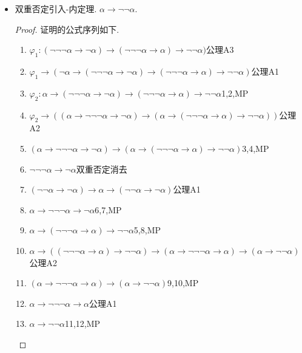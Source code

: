 \begin{itemize}
    \item 双重否定引入-内定理. \(\alpha \to \neg \neg \alpha\).
    \begin{proof}
        证明的公式序列如下.
        \begin{enumerate}
            \item \(\varphi_1: (\neg \neg \neg \alpha \to \neg \alpha) \to (\neg \neg \neg \alpha \to \alpha) \to \neg \neg \alpha)\)\hfill 公理A3 
            \item \(\varphi_1 \to (\neg \alpha \to (\neg \neg \neg \alpha \to \neg \alpha) \to (\neg \neg \neg \alpha \to \alpha) \to \neg \neg \alpha)\)\hfill 公理A1 
            \item \(\varphi_2: \alpha \to (\neg \neg \neg \alpha \to \neg \alpha) \to (\neg \neg \neg \alpha \to \alpha) \to \neg \neg \alpha\)\hfill 1,2,MP 
            \item \(\varphi_2 \to ((\alpha \to \neg \neg \neg \alpha \to \neg \alpha) \to (\alpha \to (\neg \neg \neg \alpha \to \alpha) \to \neg \neg \alpha))\)\hfill 公理A2 
            \item \((\alpha \to \neg \neg \neg \alpha \to \neg \alpha) \to (\alpha \to (\neg \neg \neg \alpha \to \alpha) \to \neg \neg \alpha)\)\hfill 3,4,MP 
            \item \(\neg \neg \neg \alpha \to \neg \alpha\)\hfill 双重否定消去 
            \item \((\neg \neg \alpha \to \neg \alpha) \to \alpha \to (\neg \neg \alpha \to \neg \alpha)\)\hfill 公理A1 
            \item \(\alpha \to \neg \neg \neg \alpha \to \neg \alpha\)\hfill 6,7,MP 
            \item \(\alpha \to (\neg \neg \neg \alpha \to \alpha) \to \neg \neg \alpha\)\hfill 5,8,MP 
            \item \(\alpha \to ((\neg \neg \neg \alpha \to \alpha) \to \neg \neg \alpha) \to (\alpha \to \neg \neg \neg \alpha \to \alpha) \to (\alpha \to \neg \neg \alpha)\)\hfill 公理A2 
            \item \((\alpha \to \neg \neg \neg \alpha \to \alpha) \to (\alpha \to \neg \neg \alpha)\)\hfill 9,10,MP 
            \item \(\alpha \to \neg \neg \neg \alpha \to \alpha\)\hfill 公理A1 
            \item \(\alpha \to \neg \neg \alpha\)\hfill 11,12,MP 
         \end{enumerate}
    \end{proof}


\end{itemize}
